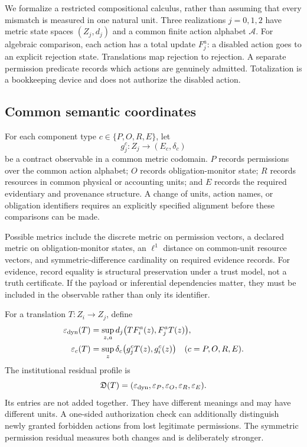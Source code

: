 We formalize a restricted compositional calculus, rather than assuming that every mismatch is measured in one natural unit. Three realizations $j=0,1,2$ have metric state spaces $(Z_j,d_j)$ and a common finite action alphabet $\mathcal A$. For algebraic comparison, each action has a total update $F_j^a$: a disabled action goes to an explicit rejection state. Translations map rejection to rejection. A separate permission predicate records which actions are genuinely admitted. Totalization is a bookkeeping device and does not authorize the disabled action.

\subsection{Common semantic coordinates}
For each component type $c\in\{P,O,R,E\}$, let
\[
g_j^c:Z_j\longrightarrow(E_c,\delta_c)
\]
be a contract observable in a common metric codomain. $P$ records permissions over the common action alphabet; $O$ records obligation-monitor state; $R$ records resources in common physical or accounting units; and $E$ records the required evidentiary and provenance structure. A change of units, action names, or obligation identifiers requires an explicitly specified alignment before these comparisons can be made.

Possible metrics include the discrete metric on permission vectors, a declared metric on obligation-monitor states, an $\ell^1$ distance on common-unit resource vectors, and symmetric-difference cardinality on required evidence records. For evidence, record equality is structural preservation under a trust model, not a truth certificate. If the payload or inferential dependencies matter, they must be included in the observable rather than only its identifier.

For a translation $T:Z_i\to Z_j$, define
\[
\begin{split}
\varepsilon_{\rm dyn}(T)
 &=\sup_{z,a}d_j\bigl(TF_i^a(z),F_j^aT(z)\bigr),\\
\varepsilon_c(T)
 &=\sup_z\delta_c\bigl(g_j^cT(z),g_i^c(z)\bigr)
 \quad(c=P,O,R,E).
\end{split}
\]
The institutional residual profile is
\[
\mathfrak D(T)=
(\varepsilon_{\rm dyn},\varepsilon_P,\varepsilon_O,
\varepsilon_R,\varepsilon_E).
\]
Its entries are not added together. They have different meanings and may have different units. A one-sided authorization check can additionally distinguish newly granted forbidden actions from lost legitimate permissions. The symmetric permission residual measures both changes and is deliberately stronger.

